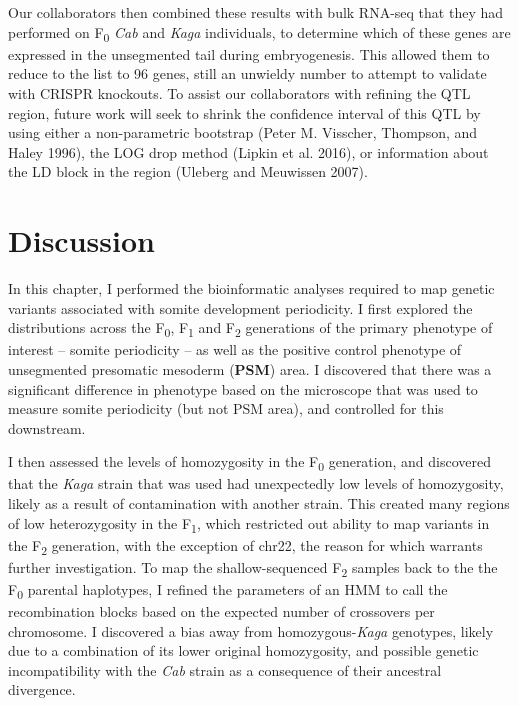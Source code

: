 \documentclass[
]{book}
\begin{document}
Our collaborators then combined these results with bulk RNA-seq that they had performed on F\textsubscript{0} \emph{Cab} and \emph{Kaga} individuals, to determine which of these genes are expressed in the unsegmented tail during embryogenesis. This allowed them to reduce to the list to 96 genes, still an unwieldy number to attempt to validate with CRISPR knockouts. To assist our collaborators with refining the QTL region, future work will seek to shrink the confidence interval of this QTL by using either a non-parametric bootstrap (Peter M. Visscher, Thompson, and Haley 1996), the LOG drop method (Lipkin et al. 2016), or information about the LD block in the region (Uleberg and Meuwissen 2007).

\hypertarget{somite-discussion}{%
\section{Discussion}\label{somite-discussion}}

In this chapter, I performed the bioinformatic analyses required to map genetic variants associated with somite development periodicity. I first explored the distributions across the F\textsubscript{0}, F\textsubscript{1} and F\textsubscript{2} generations of the primary phenotype of interest -- somite periodicity -- as well as the positive control phenotype of unsegmented presomatic mesoderm (\textbf{PSM}) area. I discovered that there was a significant difference in phenotype based on the microscope that was used to measure somite periodicity (but not PSM area), and controlled for this downstream.

I then assessed the levels of homozygosity in the F\textsubscript{0} generation, and discovered that the \emph{Kaga} strain that was used had unexpectedly low levels of homozygosity, likely as a result of contamination with another strain. This created many regions of low heterozygosity in the F\textsubscript{1}, which restricted out ability to map variants in the F\textsubscript{2} generation, with the exception of chr22, the reason for which warrants further investigation. To map the shallow-sequenced F\textsubscript{2} samples back to the the F\textsubscript{0} parental haplotypes, I refined the parameters of an HMM to call the recombination blocks based on the expected number of crossovers per chromosome. I discovered a bias away from homozygous-\emph{Kaga} genotypes, likely due to a combination of its lower original homozygosity, and possible genetic incompatibility with the \emph{Cab} strain as a consequence of their ancestral divergence.
\end{document}
